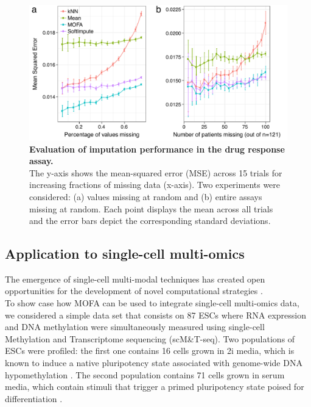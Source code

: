 \begin{figure}[H]
	\centering 	
	\includegraphics[width=1.0\textwidth]{MOFA_imputation}
	\caption{\textbf{Evaluation of imputation performance in the drug response assay.}\\
	The y-axis shows the mean-squared error (MSE) across 15 trials for increasing fractions of missing data (x-axis). Two experiments were considered: (a) values missing at random and (b) entire assays missing at random. Each point displays the mean across all trials and the error bars depict the corresponding standard deviations.}
	\label{fig:MOFA_imputation}
\end{figure}

\newpage

\subsection{Application to single-cell multi-omics} \label{section:mofa_scmt}

The emergence of single-cell multi-modal techniques has created open opportunities for the development of novel computational strategies \cite{Stuart2019,Colome-Tatche2018,Chappell2018}.\\
To show case how MOFA can be used to integrate single-cell multi-omics data, we considered a simple data set that consists on 87 ESCs where RNA expression and DNA methylation were simultaneously measured using single-cell Methylation and Transcriptome sequencing (scM\&T-seq)\cite{Angermueller2016}. Two populations of ESCs were profiled: the first one contains 16 cells grown in 2i media, which is known to induce a native pluripotency state associated with genome-wide DNA hypomethylation \cite{Ficz2013}. The second population contains 71 cells grown in serum media, which contain stimuli that trigger a primed pluripotency state poised for differentiation \cite{Tosolini2016}.

